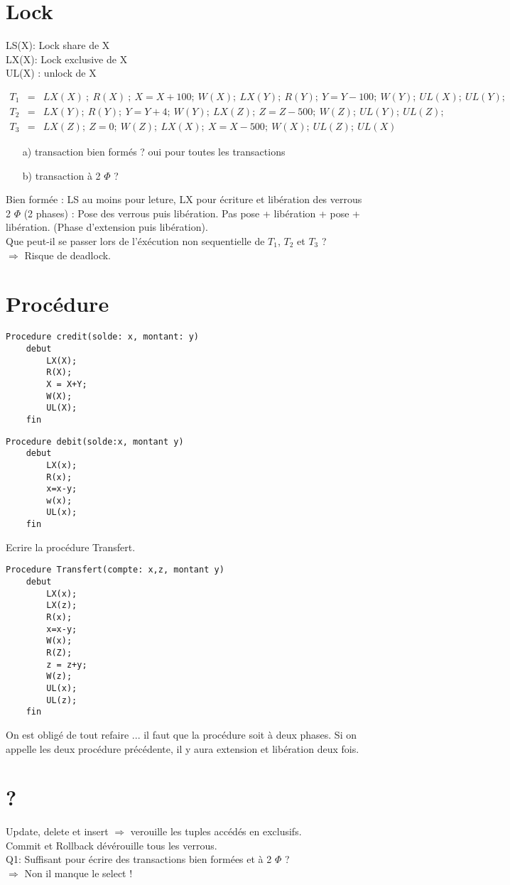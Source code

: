 \documentclass[10pt,a4paper]{article}
\begin{document}
\section*{Lock}
LS(X): Lock share de X\\
LX(X): Lock exclusive de X\\
UL(X) : unlock de X

\begin{eqnarray*}
    T_1 &=& LX(X)\ ;\ R(X)\ ;\ X=X+100;\ W(X);\ LX(Y) ;\ R(Y);\ Y=Y-100;\ W(Y);\ UL(X);\ UL(Y);\\
T_2 &=& LX(Y) ;\ R(Y) ;\ Y= Y+4 ;\ W(Y) ;\ LX(Z) ;\ Z=Z-500;\ W(Z);\ UL(Y);\ UL(Z);\\
T_3 &=& LX(Z);\ Z=0;\ W(Z);\ LX(X);\ X=X-500;\ W(X);\ UL(Z);\ UL(X)
\end{eqnarray*}
\begin{enumerate}
    \item[a)] transaction bien formés ? oui pour toutes les transactions
    \item[b)] transaction à 2 $\Phi$ ? 
\end{enumerate}
Bien formée : LS au moins pour leture, LX pour écriture et libération des verrous
2 $\Phi$ (2 phases) : Pose des verrous puis libération. Pas pose + libération + pose + libération.
(Phase d'extension puis libération).\\
Que peut-il se passer lors de l'éxécution non sequentielle de $T_1$, $T_2$ et $T_3$ ?\\
$\Rightarrow$ Risque de deadlock.
\section*{Procédure}
\begin{lstlisting}[language=Algo]
Procedure credit(solde: x, montant: y)
    debut
        LX(X);
        R(X);
        X = X+Y;
        W(X);
        UL(X);
    fin
\end{lstlisting}
\begin{lstlisting}[language=Algo]
Procedure debit(solde:x, montant y)
    debut
        LX(x);
        R(x);
        x=x-y;
        w(x);
        UL(x);
    fin
\end{lstlisting}
Ecrire la procédure Transfert.
\begin{lstlisting}
Procedure Transfert(compte: x,z, montant y)
    debut
        LX(x);
        LX(z);
        R(x);
        x=x-y;
        W(x);
        R(Z);
        z = z+y;
        W(z);
        UL(x);
        UL(z);
    fin
\end{lstlisting}
On est obligé de tout refaire ... il faut que la procédure soit à deux phases. Si on appelle les deux procédure précédente,
il y aura extension et libération deux fois.
\section*{?}
Update, delete et insert $\Rightarrow$ verouille les tuples accédés en exclusifs.\\
Commit et Rollback dévérouille tous les verrous.\\
Q1: Suffisant pour écrire des transactions bien formées et à 2 $\Phi$  ?\\
$\Rightarrow$ Non il manque le select !
\end{document}
